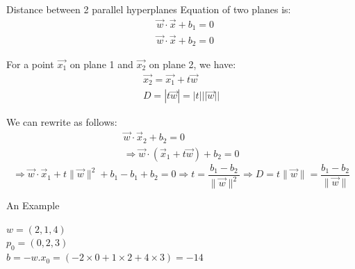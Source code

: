 \documentclass{beamer}
\begin{document}
\begin{frame}{Distance between 2 parallel hyperplanes}
Equation of two planes is:
$$
\begin{aligned}
&\vec{w}\cdot \vec{x}+b_1=0\\
&\vec{w}\cdot \vec{x}+b_2=0
\end{aligned}
$$

\pause For a point $\vec{x_1}$ on plane 1 and $\vec{x_2}$ on plane 2, we have:
\pause $$
\begin{array}{l}
{\overrightarrow{x_{2}}=\overrightarrow{x_{1}}+t \vec{w}} \\
{D=|t \vec{w}|=|t|||\vec{w}| |}
\end{array}
$$

\pause We can rewrite as follows:
\pause $$
\begin{array}{c}
{\vec{w} \cdot \vec{x}_{2}+b_{2}=0} \\
{\Rightarrow \vec{w} \cdot\left(\vec{x}_{1}+t \vec{w}\right)+b_{2}=0}
\end{array}
$$
\pause $$
\Rightarrow \vec{w} \cdot \vec{x}_{1}+t\|\vec{w}\|^{2}+b_1-b_1+b_2 = 0
\Rightarrow t = \frac{b_1 - b_2}{\|\vec{w}\|^{2}}  \Rightarrow D = t\|\vec{w}\| =  \frac{b_1 - b_2}{\|\vec{w}\|}
$$
\end{frame}

\begin{frame}{An Example}

$w = (2,1,4)$\\
$p_{0} = (0,2,3)$\\
$b = -w.x_{0} = (-2 \times 0 + 1 \times 2 + 4 \times 3) = -14$\\

\end{frame}
\end{document}
